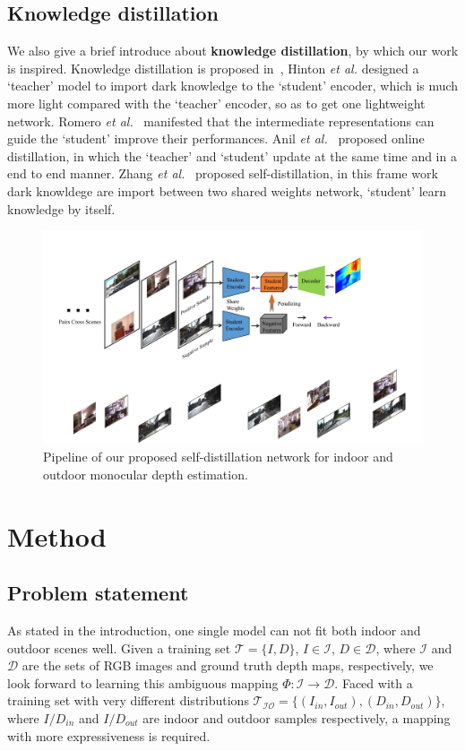 \documentclass{svjour3}                     %
\begin{document}
\subsection{Knowledge distillation}
We also give a brief introduce about \textbf{knowledge distillation}, by which our
work is inspired.
Knowledge distillation is proposed in~\cite{hinton2015distilling}, Hinton \textit{et al.} designed a `teacher' model to import dark knowledge to the `student' encoder, which is much more light compared with the `teacher' encoder, so as to get one lightweight network. Romero \textit{et al.}~\cite{romero2014fitnets} manifested that the intermediate representations can guide the `student' improve their performances. Anil \textit{et al.}~\cite{anil2018large} proposed online distillation, in which the `teacher' and `student' update at the same time and in a end to end manner. Zhang \textit{et al.}~\cite{zhang_self_distillation} proposed self-distillation, in this frame work dark knowldege are import between two 
shared weights network, `student' learn knowledge by itself. 
\begin{figure}[t]
  \centering
\includegraphics[width=0.9\linewidth]{images/Stream.pdf}
\centering
     \caption{Pipeline of our proposed self-distillation network for indoor and outdoor monocular depth estimation.}
 \label{Stream of algorithm} 
\end{figure}

\section{Method}
\subsection{Problem statement}
As stated in the introduction, one single model can not fit both indoor and outdoor
scenes well. Given a training set $\mathcal{T} = \{I,D\}$, $I\in \mathcal{I}$, $D\in \mathcal{D}$, where $\mathcal{I}$ 
and $\mathcal{D}$ are the sets of RGB images and ground truth depth maps,  respectively, we look forward to
learning this ambiguous mapping $\varPhi:\mathcal{I}\rightarrow \mathcal{D}$. Faced with a training set 
with very different distributions $\mathcal{T_{IO}} = \{(I_{in},I_{out}), (D_{in},D_{out})\}$, where $I/D_{in}$ and $I/D_{out}$ are indoor and outdoor samples
respectively, a mapping with more expressiveness is required.
\end{document}
